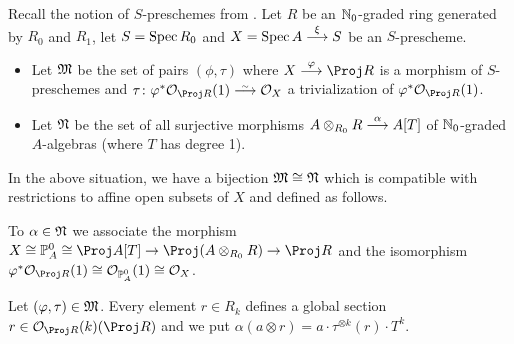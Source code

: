 \documentclass[a4paper,parskip=half,numbers=enddot, DIV=12]{scrreprt}
\begin{document}
Recall the notion of $S$-preschemes from \cite[Definition~1.5.7]{alggeo1}. Let $R$ be an $\mathbb{N}_0$-graded ring generated by $R_0$ and $R_1$, let $S=\operatorname{Spec} R_0$ and $X=\Spec A\morphism[\xi]S$ be an $S$-prescheme. 
\begin{itemize}
	\item Let $\mathfrak{M}$ be the set of pairs $(\phi,\tau)$ where $X\morphism[\phi]\Proj R$ is a morphism of $S$-preschemes and $\tau\colon \phi^*\Oo_{\Proj R}(1)\isomorphism\Oo_X$ a trivialization of $\phi^*\Oo_{\Proj R}(1)$.
	\item Let $\mathfrak{N}$ be the set of all surjective morphisms $A\otimes_{R_0}R\morphism[\alpha]A[T]$ of $\mathbb{N}_0$-graded $A$-algebras (where $T$ has degree 1).
\end{itemize}
\begin{lem}
	In the above situation, we have a bijection $\mathfrak{M}\cong\mathfrak{N}$ which is compatible with restrictions to affine open subsets of $X$ and defined as follows.
	\begin{alphanumerate}
		\item To $\alpha\in\mathfrak{N}$ we associate the morphism $X\cong \IP_A^0\cong\Proj A[T]\morphism\Proj (A\otimes_{R_0}R)\morphism\Proj R$ and the isomorphism $\phi^*\Oo_{\Proj R}(1)\cong \Oo_{\IP_A^0}(1)\cong \Oo_X$.
		\item Let $(\varphi,\tau)\in\mathfrak{M}$. Every element $r\in R_k$ defines a global section $r\in\Oo_{\Proj R}(k)(\Proj R)$ and we put $\alpha(a\otimes r)=a\cdot \tau^{\otimes k}(r)\cdot T^k$.
	\end{alphanumerate}
\end{lem}
\end{document}
